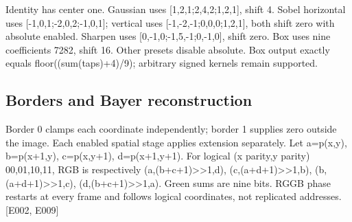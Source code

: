 \documentclass[11pt,a4paper]{article}
\begin{document}
Identity has center one. Gaussian uses [\allowbreak{}1,\allowbreak{}2,\allowbreak{}1;2,\allowbreak{}4,\allowbreak{}2;1,\allowbreak{}2,\allowbreak{}1]\allowbreak{},\allowbreak{} shift 4. Sobel horizontal uses [\allowbreak{}-1,\allowbreak{}0,\allowbreak{}1;-2,\allowbreak{}0,\allowbreak{}2;-1,\allowbreak{}0,\allowbreak{}1]\allowbreak{}; vertical uses [\allowbreak{}-1,\allowbreak{}-2,\allowbreak{}-1;0,\allowbreak{}0,\allowbreak{}0;1,\allowbreak{}2,\allowbreak{}1]\allowbreak{},\allowbreak{} both shift zero with absolute enabled. Sharpen uses [\allowbreak{}0,\allowbreak{}-1,\allowbreak{}0;-1,\allowbreak{}5,\allowbreak{}-1;0,\allowbreak{}-1,\allowbreak{}0]\allowbreak{},\allowbreak{} shift zero. Box uses nine coefficients 7282,\allowbreak{} shift 16. Other presets disable absolute. Box output exactly equals floor(\allowbreak{}(\allowbreak{}sum(\allowbreak{}taps)\allowbreak{}+\allowbreak{}4)\allowbreak{}/\allowbreak{}9)\allowbreak{}; arbitrary signed kernels remain supported.

\subsection{Borders and Bayer reconstruction}

Border 0 clamps each coordinate independently; border 1 supplies zero outside the image. Each enabled spatial stage applies extension separately. Let a=\allowbreak{}p(\allowbreak{}x,\allowbreak{}y)\allowbreak{},\allowbreak{} b=\allowbreak{}p(\allowbreak{}x+\allowbreak{}1,\allowbreak{}y)\allowbreak{},\allowbreak{} c=\allowbreak{}p(\allowbreak{}x,\allowbreak{}y+\allowbreak{}1)\allowbreak{},\allowbreak{} d=\allowbreak{}p(\allowbreak{}x+\allowbreak{}1,\allowbreak{}y+\allowbreak{}1)\allowbreak{}. For logical (\allowbreak{}x parity,\allowbreak{}y parity)\allowbreak{} 00,\allowbreak{}01,\allowbreak{}10,\allowbreak{}11,\allowbreak{} RGB is respectively (\allowbreak{}a,\allowbreak{}(\allowbreak{}b+\allowbreak{}c+\allowbreak{}1)\allowbreak{}>>1,\allowbreak{}d)\allowbreak{},\allowbreak{} (\allowbreak{}c,\allowbreak{}(\allowbreak{}a+\allowbreak{}d+\allowbreak{}1)\allowbreak{}>>1,\allowbreak{}b)\allowbreak{},\allowbreak{} (\allowbreak{}b,\allowbreak{}(\allowbreak{}a+\allowbreak{}d+\allowbreak{}1)\allowbreak{}>>1,\allowbreak{}c)\allowbreak{},\allowbreak{} (\allowbreak{}d,\allowbreak{}(\allowbreak{}b+\allowbreak{}c+\allowbreak{}1)\allowbreak{}>>1,\allowbreak{}a)\allowbreak{}. Green sums are nine bits. RGGB phase restarts at every frame and follows logical coordinates,\allowbreak{} not replicated addresses. [\allowbreak{}E002,\allowbreak{} E009]\allowbreak{}
\end{document}
